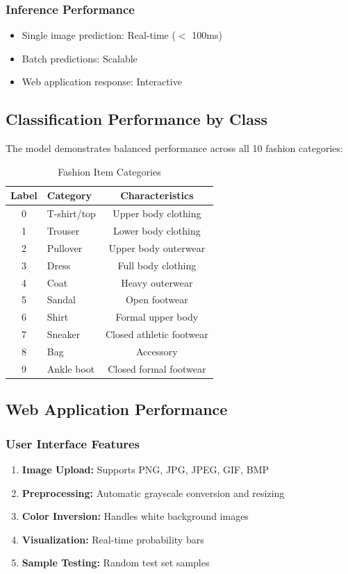 \documentclass[12pt,a4paper]{article}
\begin{document}
\subsubsection{Inference Performance}
\begin{itemize}
    \item Single image prediction: Real-time ($<$ 100ms)
    \item Batch predictions: Scalable
    \item Web application response: Interactive
\end{itemize}

\subsection{Classification Performance by Class}

The model demonstrates balanced performance across all 10 fashion categories:

\begin{table}[H]
\centering
\caption{Fashion Item Categories}
\begin{tabular}{clc}
\toprule
\textbf{Label} & \textbf{Category} & \textbf{Characteristics} \\
\midrule
0 & T-shirt/top & Upper body clothing \\
1 & Trouser & Lower body clothing \\
2 & Pullover & Upper body outerwear \\
3 & Dress & Full body clothing \\
4 & Coat & Heavy outerwear \\
5 & Sandal & Open footwear \\
6 & Shirt & Formal upper body \\
7 & Sneaker & Closed athletic footwear \\
8 & Bag & Accessory \\
9 & Ankle boot & Closed formal footwear \\
\bottomrule
\end{tabular}
\end{table}

\subsection{Web Application Performance}

\subsubsection{User Interface Features}
\begin{enumerate}
    \item \textbf{Image Upload:} Supports PNG, JPG, JPEG, GIF, BMP
    \item \textbf{Preprocessing:} Automatic grayscale conversion and resizing
    \item \textbf{Color Inversion:} Handles white background images
    \item \textbf{Visualization:} Real-time probability bars
    \item \textbf{Sample Testing:} Random test set samples
\end{enumerate}
\end{document}
